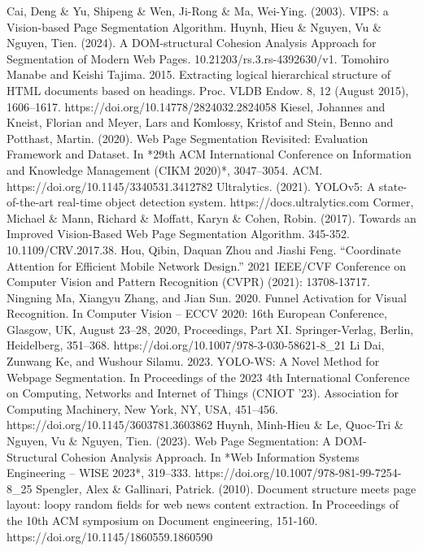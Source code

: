 \documentclass[conference]{IEEEtran}
\begin{document}
\begin{thebibliography}{00}
 Cai, Deng \& Yu, Shipeng \& Wen, Ji-Rong \& Ma, Wei-Ying. (2003). VIPS: a Vision-based Page Segmentation Algorithm. 
 Huynh, Hieu \& Nguyen, Vu \& Nguyen, Tien. (2024). A DOM-structural Cohesion Analysis Approach for Segmentation of Modern Web Pages. 10.21203/rs.3.rs-4392630/v1. 
 Tomohiro Manabe and Keishi Tajima. 2015. Extracting logical hierarchical structure of HTML documents based on headings. Proc. VLDB Endow. 8, 12 (August 2015), 1606–1617. https://doi.org/10.14778/2824032.2824058
 Kiesel, Johannes and Kneist, Florian and Meyer, Lars and Komlossy, Kristof and Stein, Benno and Potthast, Martin. (2020). Web Page Segmentation Revisited: Evaluation Framework and Dataset. In *29th ACM International Conference on Information and Knowledge Management (CIKM 2020)*, 3047--3054. ACM. https://doi.org/10.1145/3340531.3412782
 Ultralytics. (2021). YOLOv5: A state-of-the-art real-time object detection system. https://docs.ultralytics.com 
 Cormer, Michael \& Mann, Richard \& Moffatt, Karyn \& Cohen, Robin. (2017). Towards an Improved Vision-Based Web Page Segmentation Algorithm. 345-352. 10.1109/CRV.2017.38.
 Hou, Qibin, Daquan Zhou and Jiashi Feng. “Coordinate Attention for Efficient Mobile Network Design.” 2021 IEEE/CVF Conference on Computer Vision and Pattern Recognition (CVPR) (2021): 13708-13717.
 Ningning Ma, Xiangyu Zhang, and Jian Sun. 2020. Funnel Activation for Visual Recognition. In Computer Vision – ECCV 2020: 16th European Conference, Glasgow, UK, August 23–28, 2020, Proceedings, Part XI. Springer-Verlag, Berlin, Heidelberg, 351–368. https://doi.org/10.1007/978-3-030-58621-8\_21 %
 Li Dai, Zunwang Ke, and Wushour Silamu. 2023. YOLO-WS: A Novel Method for Webpage Segmentation. In Proceedings of the 2023 4th International Conference on Computing, Networks and Internet of Things (CNIOT '23). Association for Computing Machinery, New York, NY, USA, 451–456. https://doi.org/10.1145/3603781.3603862
 Huynh, Minh-Hieu \& Le, Quoc-Tri \& Nguyen, Vu \& Nguyen, Tien. (2023). Web Page Segmentation: A DOM-Structural Cohesion Analysis Approach. In *Web Information Systems Engineering – WISE 2023*, 319–333. https://doi.org/10.1007/978-981-99-7254-8\_25
 Spengler, Alex \& Gallinari, Patrick. (2010). Document structure meets page layout: loopy random fields for web news content extraction. In Proceedings of the 10th ACM symposium on Document engineering, 151-160. https://doi.org/10.1145/1860559.1860590

\end{thebibliography}
\end{document}
